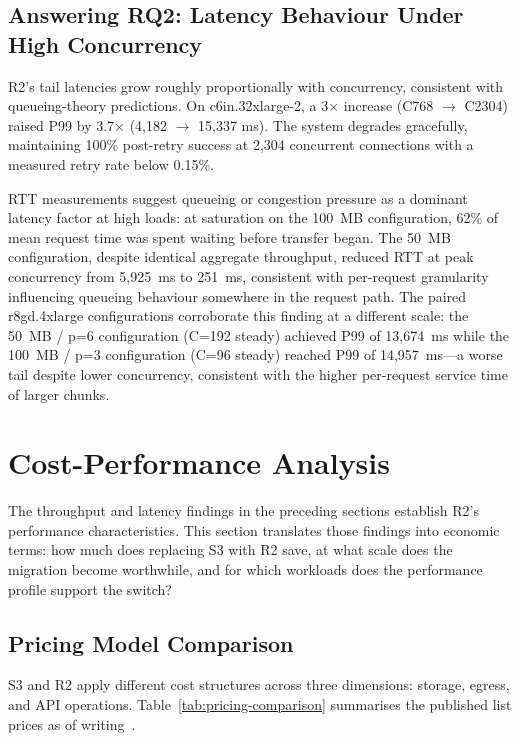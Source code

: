 \subsection{Answering RQ2: Latency Behaviour Under High Concurrency}

R2's tail latencies grow roughly proportionally with concurrency, consistent with queueing-theory predictions. On c6in.32xlarge-2, a 3× increase (C768 $\to$ C2304) raised P99 by 3.7× (4,182 $\to$ 15,337 ms). The system degrades gracefully, maintaining 100\% post-retry success at 2,304 concurrent connections with a measured retry rate below 0.15\%.

RTT measurements suggest queueing or congestion pressure as a dominant latency factor at high loads: at saturation on the 100~MB configuration, 62\% of mean request time was spent waiting before transfer began. The 50~MB configuration, despite identical aggregate throughput, reduced RTT at peak concurrency from 5,925~ms to 251~ms, consistent with per-request granularity influencing queueing behaviour somewhere in the request path. The paired r8gd.4xlarge configurations corroborate this finding at a different scale: the 50~MB / p=6 configuration (C=192 steady) achieved P99 of 13,674~ms while the 100~MB / p=3 configuration (C=96 steady) reached P99 of 14,957~ms---a worse tail despite lower concurrency, consistent with the higher per-request service time of larger chunks.

\section{Cost-Performance Analysis}\label{sec:cost-performance}

The throughput and latency findings in the preceding sections establish R2's performance characteristics. This section translates those findings into economic terms: how much does replacing S3 with R2 save, at what scale does the migration become worthwhile, and for which workloads does the performance profile support the switch?

\subsection{Pricing Model Comparison}

S3 and R2 apply different cost structures across three dimensions: storage, egress, and API operations. Table~\ref{tab:pricing-comparison} summarises the published list prices as of writing~\cite{aws-s3-pricing,cloudflare-r2-pricing}.

